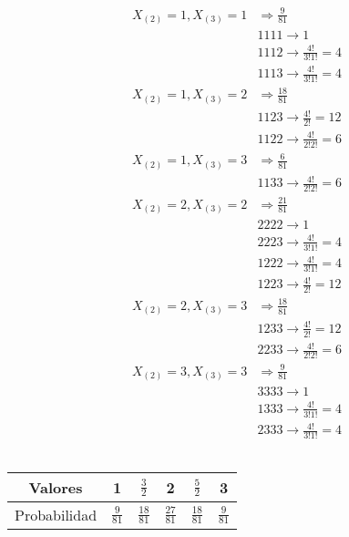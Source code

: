 \documentclass{article}
\begin{document}
    \begin{align*}
      X_{(2)} = 1,X_{(3)} = 1 & \Rightarrow \frac{9}{81}\\
      &1111 \rightarrow 1 \\
      &1112 \rightarrow \frac{4!}{3!1!} = 4 \\
      &1113 \rightarrow \frac{4!}{3!1!} = 4 \\
      X_{(2)} = 1,X_{(3)} = 2 & \Rightarrow \frac{18}{81}\\
      &1123 \rightarrow \frac{4!}{2!} = 12 \\
      &1122 \rightarrow \frac{4!}{2!2!} = 6  \\
      X_{(2)} = 1,X_{(3)} = 3 & \Rightarrow \frac{6}{81}\\
      &1133 \rightarrow \frac{4!}{2!2!} = 6  \\
      X_{(2)} = 2,X_{(3)} = 2 & \Rightarrow \frac{21}{81}\\
      &2222 \rightarrow 1 \\
      &2223 \rightarrow \frac{4!}{3!1!} = 4 \\
      &1222 \rightarrow \frac{4!}{3!1!} = 4 \\
      &1223 \rightarrow \frac{4!}{2!} = 12 \\
      X_{(2)} = 2,X_{(3)} = 3 & \Rightarrow \frac{18}{81}\\
      &1233 \rightarrow \frac{4!}{2!} = 12 \\
      &2233 \rightarrow \frac{4!}{2!2!} = 6  \\
      X_{(2)} = 3,X_{(3)} = 3 & \Rightarrow \frac{9}{81}\\
      &3333 \rightarrow 1 \\
      &1333 \rightarrow \frac{4!}{3!1!} = 4 \\
      &2333 \rightarrow \frac{4!}{3!1!} = 4 \\
    \end{align*}


    \begin{table}[H]
      \centering
      \begin{tabular}{ c | c c c c c|}
        Valores       & 1               & $\frac{3}{2}$   & 2               & $\frac{5}{2}$   & 3               \\ \hline
        Probabilidad  & $\frac{9}{81}$  & $\frac{18}{81}$ & $\frac{27}{81}$ & $\frac{18}{81}$ & $\frac{9}{81}$
      \end{tabular}
      \caption{}
      \label{}
    \end{table}

  \nocite{prob2017}


  
  
\end{document}
